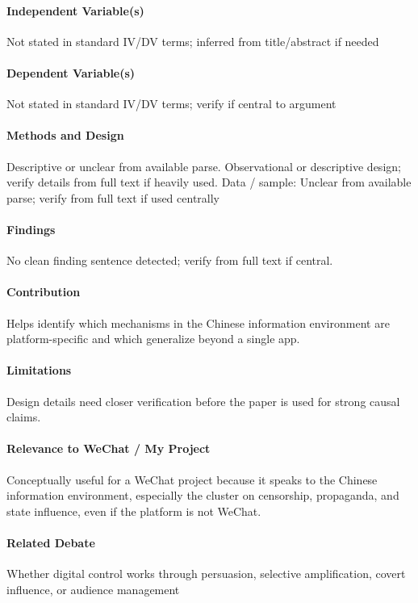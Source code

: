 \documentclass[12pt]{article}
\begin{document}
\paragraph{Independent Variable(s)} Not stated in standard IV/DV terms; inferred from title/abstract if needed

\paragraph{Dependent Variable(s)} Not stated in standard IV/DV terms; verify if central to argument

\paragraph{Methods and Design} Descriptive or unclear from available parse. Observational or descriptive design; verify details from full text if heavily used. Data / sample: Unclear from available parse; verify from full text if used centrally

\paragraph{Findings} No clean finding sentence detected; verify from full text if central.

\paragraph{Contribution} Helps identify which mechanisms in the Chinese information environment are platform-specific and which generalize beyond a single app.

\paragraph{Limitations} Design details need closer verification before the paper is used for strong causal claims.

\paragraph{Relevance to WeChat / My Project} Conceptually useful for a WeChat project because it speaks to the Chinese information environment, especially the cluster on censorship, propaganda, and state influence, even if the platform is not WeChat.

\paragraph{Related Debate} Whether digital control works through persuasion, selective amplification, covert influence, or audience management
\end{document}
